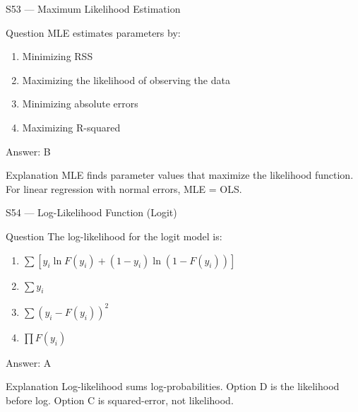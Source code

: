 \documentclass[aspectratio=169,8pt]{beamer}
\begin{document}
	\begin{frame}{S53 --- Maximum Likelihood Estimation}
		\begin{block}{Question}
			MLE estimates parameters by:
			\begin{enumerate}
				\item Minimizing RSS
				\item Maximizing the likelihood of observing the data
				\item Minimizing absolute errors
				\item Maximizing R-squared
			\end{enumerate}
		\end{block}
		\begin{exampleblock}{Answer: B}\end{exampleblock}
		\begin{block}{Explanation}
			MLE finds parameter values that maximize the likelihood function. For linear regression with normal errors, MLE = OLS.
		\end{block}
	\end{frame}
	
	\begin{frame}{S54 --- Log-Likelihood Function (Logit)}
		\begin{block}{Question}
			The log-likelihood for the logit model is:
			\begin{enumerate}
				\item $\sum [y_i \ln F(y_i) + (1-y_i)\ln(1-F(y_i))]$
				\item $\sum y_i$
				\item $\sum (y_i - F(y_i))^2$
				\item $\prod F(y_i)$
			\end{enumerate}
		\end{block}
		\begin{exampleblock}{Answer: A}\end{exampleblock}
		\begin{block}{Explanation}
			Log-likelihood sums log-probabilities. Option D is the likelihood before log. Option C is squared-error, not likelihood.
		\end{block}
	\end{frame}
	
\end{document}
